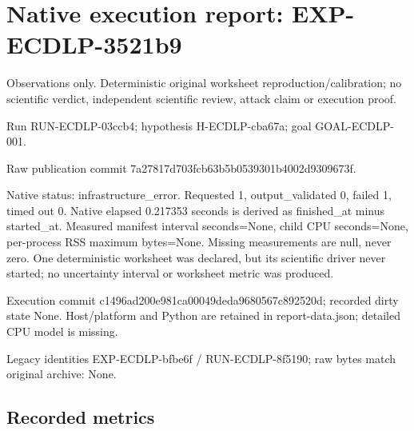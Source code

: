 \documentclass[10pt]{article}
\begin{document}
\section*{Native execution report: EXP-ECDLP-3521b9}
\noindent Observations only. Deterministic original worksheet reproduction/calibration; no scientific verdict, independent scientific review, attack claim or execution proof.\par\medskip
\noindent Run RUN-ECDLP-03ccb4; hypothesis H-ECDLP-cba67a; goal GOAL-ECDLP-001.\par
\noindent Raw publication commit 7a27817d703fcb63b5b0539301b4002d9309673f.\par\medskip
Native status: infrastructure\_error. Requested 1, output\_validated 0, failed 1, timed out 0. Native elapsed 0.217353 seconds is derived as finished\_at minus started\_at. Measured manifest interval seconds=None, child CPU seconds=None, per-process RSS maximum bytes=None. Missing measurements are null, never zero. One deterministic worksheet was declared, but its scientific driver never started; no uncertainty interval or worksheet metric was produced.\par\medskip
Execution commit c1496ad200e981ca00049deda9680567c892520d; recorded dirty state None. Host/platform and Python are retained in report-data.json; detailed CPU model is missing.\par\medskip
Legacy identities EXP-ECDLP-bfbe6f / RUN-ECDLP-8f5190; raw bytes match original archive: None.
\subsection*{Recorded metrics}

\end{document}
